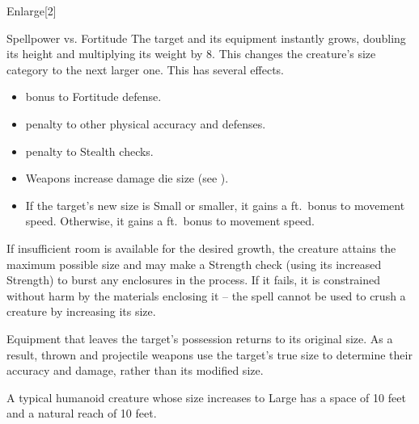 \begin{spellsection}{Enlarge}[2]
    \begin{spellheader}
    \end{spellheader}
    \begin{spellcontent}
        \begin{spelltargetinginfo}
        \end{spelltargetinginfo}
        \begin{spelleffects}
            \begin{spellattack}{Spellpower vs. Fortitude}
                \spellsuccess The target and its equipment instantly grows, doubling its height and multiplying its weight by 8. This changes the creature's size category to the next larger one. This has several effects.
                \begin{itemize}
                    \item {} bonus to Fortitude defense.
                    \item {} penalty to other physical accuracy and defenses.
                    \item {} penalty to Stealth checks.
                    \item Weapons increase damage die size (see ).
                    \item If the target's new size is Small or smaller, it gains a  ft.\ bonus to movement speed. Otherwise, it gains a  ft.\ bonus to movement speed.
                \end{itemize}
                \par If insufficient room is available for the desired growth, the creature attains the maximum possible size and may make a Strength check (using its increased Strength) to burst any enclosures in the process. If it fails, it is constrained without harm by the materials enclosing it -- the spell cannot be used to crush a creature by increasing its size.
                \par Equipment that leaves the target's possession returns to its original size.
                As a result, thrown and projectile weapons use the target's true size to determine their accuracy and damage, rather than its modified size.
            \end{spellattack}
            \spelldur \durshort \dismissable
        \end{spelleffects}
    \end{spellcontent}
    \begin{spellfooter}
        \spellnotes A typical humanoid creature whose size increases to Large has a space of 10 feet and a natural reach of 10 feet. \sizingspellnotes
        \miscastrandom
    \end{spellfooter}
    \begin{spellaugments}
    \end{spellaugments}
\end{spellsection}

